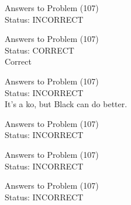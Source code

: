 \documentclass[11pt]{article}
\begin{document}
\begin{minipage}[t]{0.5\textwidth}
  {\centering
  
  Answers to Problem (107)\\
  Status: INCORRECT\\
  
  }
\end{minipage}
\begin{minipage}[t]{0.5\textwidth}
  {\centering
  
  Answers to Problem (107)\\
  Status: CORRECT\\
  Correct\\
  }
\end{minipage}
\begin{minipage}[t]{0.5\textwidth}
  {\centering
  
  Answers to Problem (107)\\
  Status: INCORRECT\\
  It's a ko, but Black can do better.\\
  }
\end{minipage}
\begin{minipage}[t]{0.5\textwidth}
  {\centering
  
  Answers to Problem (107)\\
  Status: INCORRECT\\
  
  }
\end{minipage}
\begin{minipage}[t]{0.5\textwidth}
  {\centering
  
  Answers to Problem (107)\\
  Status: INCORRECT\\
  
  }
\end{minipage}
\begin{minipage}[t]{0.5\textwidth}
  {\centering
  
  Answers to Problem (107)\\
  Status: INCORRECT\\
  
  }
\end{minipage}
\end{document}
